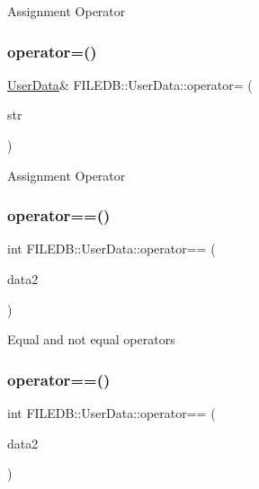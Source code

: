 Assignment Operator \mbox{\label{classFILEDB_1_1UserData_ab41f011c29fc6e394dbb1b960c7947b0}} 
\subsubsection{\texorpdfstring{operator=()}{operator=()}\hspace{0.1cm}{\footnotesize\ttfamily [6/6]}}
{\footnotesize\ttfamily \mbox{\hyperlink{classFILEDB_1_1UserData}{User\+Data}}\& F\+I\+L\+E\+D\+B\+::\+User\+Data\+::operator= (\begin{DoxyParamCaption}\item[{const std\+::string \&}]{str }\end{DoxyParamCaption})}

Assignment Operator \mbox{\label{classFILEDB_1_1UserData_a1ba93b241613cfbecceabb9bf1040d2e}} 
\subsubsection{\texorpdfstring{operator==()}{operator==()}\hspace{0.1cm}{\footnotesize\ttfamily [1/3]}}
{\footnotesize\ttfamily int F\+I\+L\+E\+D\+B\+::\+User\+Data\+::operator== (\begin{DoxyParamCaption}\item[{const \mbox{\hyperlink{classFILEDB_1_1UserData}{User\+Data}} \&}]{data2 }\end{DoxyParamCaption})}

Equal and not equal operators \mbox{\label{classFILEDB_1_1UserData_a1ba93b241613cfbecceabb9bf1040d2e}} 
\subsubsection{\texorpdfstring{operator==()}{operator==()}\hspace{0.1cm}{\footnotesize\ttfamily [2/3]}}
{\footnotesize\ttfamily int F\+I\+L\+E\+D\+B\+::\+User\+Data\+::operator== (\begin{DoxyParamCaption}\item[{const \mbox{\hyperlink{classFILEDB_1_1UserData}{User\+Data}} \&}]{data2 }\end{DoxyParamCaption})}


